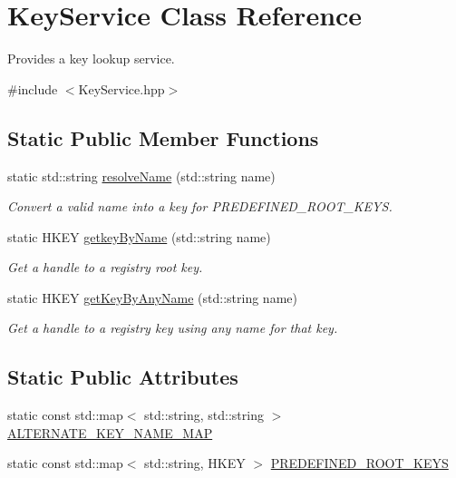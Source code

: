 \hypertarget{class_key_service}{}\section{Key\+Service Class Reference}
\label{class_key_service}


Provides a key lookup service.  




{\ttfamily \#include $<$Key\+Service.\+hpp$>$}

\subsection*{Static Public Member Functions}
\begin{DoxyCompactItemize}
\item 
static std\+::string \hyperlink{class_key_service_a805af87356befa87fe19820b952afdf6}{resolve\+Name} (std\+::string name)
\begin{DoxyCompactList}\small\item\em Convert a valid name into a key for P\+R\+E\+D\+E\+F\+I\+N\+E\+D\+\_\+\+R\+O\+O\+T\+\_\+\+K\+E\+Y\+S. \end{DoxyCompactList}\item 
static H\+K\+E\+Y \hyperlink{class_key_service_ab8a39c0f99348ff255db17939d765700}{getkey\+By\+Name} (std\+::string name)
\begin{DoxyCompactList}\small\item\em Get a handle to a registry root key. \end{DoxyCompactList}\item 
static H\+K\+E\+Y \hyperlink{class_key_service_ad936e7e6affaefd1a032574d2c5513f9}{get\+Key\+By\+Any\+Name} (std\+::string name)
\begin{DoxyCompactList}\small\item\em Get a handle to a registry key using any name for that key. \end{DoxyCompactList}\end{DoxyCompactItemize}
\subsection*{Static Public Attributes}
\begin{DoxyCompactItemize}
\item 
static const std\+::map$<$ std\+::string, std\+::string $>$ \hyperlink{class_key_service_a142ce8aec67304045a1151e6ac8429a1}{A\+L\+T\+E\+R\+N\+A\+T\+E\+\_\+\+K\+E\+Y\+\_\+\+N\+A\+M\+E\+\_\+\+M\+A\+P}
\item 
static const std\+::map$<$ std\+::string, H\+K\+E\+Y $>$ \hyperlink{class_key_service_a105020a568634a91740816aff99ad318}{P\+R\+E\+D\+E\+F\+I\+N\+E\+D\+\_\+\+R\+O\+O\+T\+\_\+\+K\+E\+Y\+S}
\end{DoxyCompactItemize}


